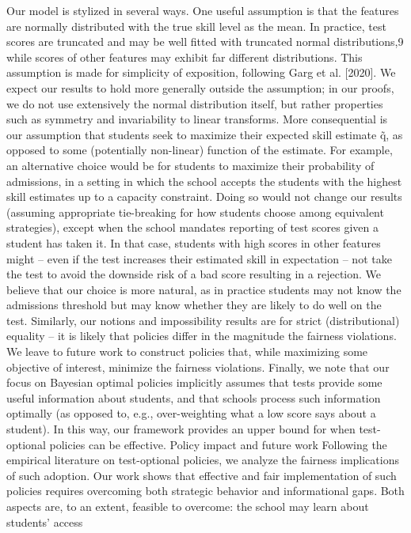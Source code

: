 \documentclass[10pt]{article}
\begin{document}
\begin{ReviewVerbatim}
Our model is stylized in several ways. One useful assumption is that the features are normally
distributed with the true skill level as the mean. In practice, test scores are truncated and may
be well ﬁtted with truncated normal distributions,9 while scores of other features may exhibit far
diﬀerent distributions. This assumption is made for simplicity of exposition, following Garg et al.
[2020]. We expect our results to hold more generally outside the assumption; in our proofs, we
do not use extensively the normal distribution itself, but rather properties such as symmetry and
invariability to linear transforms.
More consequential is our assumption that students seek to maximize their expected skill estimate q̃, as opposed to some (potentially non-linear) function of the estimate. For example, an
alternative choice would be for students to maximize their probability of admissions, in a setting in
which the school accepts the students with the highest skill estimates up to a capacity constraint.
Doing so would not change our results (assuming appropriate tie-breaking for how students choose
among equivalent strategies), except when the school mandates reporting of test scores given a student has taken it. In that case, students with high scores in other features might – even if the test
increases their estimated skill in expectation – not take the test to avoid the downside risk of a bad
score resulting in a rejection. We believe that our choice is more natural, as in practice students
may not know the admissions threshold but may know whether they are likely to do well on the test.
Similarly, our notions and impossibility results are for strict (distributional) equality – it is likely
that policies diﬀer in the magnitude the fairness violations. We leave to future work to construct
policies that, while maximizing some objective of interest, minimize the fairness violations.
Finally, we note that our focus on Bayesian optimal policies implicitly assumes that tests provide
some useful information about students, and that schools process such information optimally (as
opposed to, e.g., over-weighting what a low score says about a student). In this way, our framework
provides an upper bound for when test-optional policies can be eﬀective.
Policy impact and future work Following the empirical literature on test-optional policies,
we analyze the fairness implications of such adoption. Our work shows that eﬀective and fair
implementation of such policies requires overcoming both strategic behavior and informational gaps.
Both aspects are, to an extent, feasible to overcome: the school may learn about students’ access

\end{ReviewVerbatim}
\end{document}
